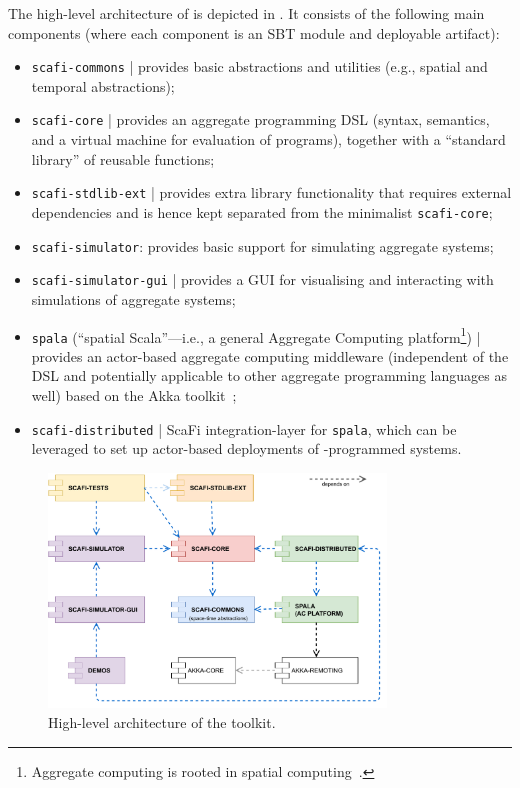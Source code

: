 The high-level architecture of \scafi{} is depicted in .
It consists of the following main components (where each component is an SBT module and deployable artifact):
\begin{itemize}
\item \texttt{scafi-commons} | provides basic abstractions and utilities (e.g., spatial and temporal abstractions);
\item \texttt{scafi-core} | provides an aggregate programming DSL (syntax, semantics, and a virtual machine for evaluation of programs), together with a ``standard library'' of reusable functions;
\item \texttt{scafi-stdlib-ext} | provides extra library functionality that requires external dependencies and is hence kept separated from the minimalist \texttt{scafi-core};
\item \texttt{scafi-simulator}: provides basic support for simulating aggregate systems;
\item \texttt{scafi-simulator-gui} | provides a GUI for visualising and interacting with simulations of aggregate systems;
\item \texttt{spala} (``spatial Scala''---i.e., a general Aggregate Computing platform\footnote{Aggregate computing is rooted in spatial computing~\cite{DBLP:journals/corr/abs-1202-5509}.}) | provides an actor-based aggregate computing middleware
(independent of the \scafi{} DSL and potentially applicable to other aggregate programming languages as well)
based on the Akka toolkit~\cite{akka};
\item \texttt{scafi-distributed} | ScaFi integration-layer for \texttt{spala},
which can be leveraged to set up actor-based deployments of \scafi{}-programmed systems.
\end{itemize}

\begin{figure}
\centering
\includegraphics[width=0.8\textwidth]{papers/softwarex2021/imgs/scafi-project-org.pdf}
\caption{High-level architecture of the \scafi{} toolkit.}
\label{fig:scafi-arch}
\end{figure}

